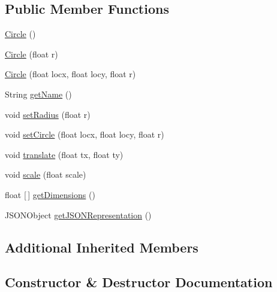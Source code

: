 \subsection*{Public Member Functions}
\begin{DoxyCompactItemize}
\item 
\mbox{\hyperlink{classbridges_1_1base_1_1_circle_a807231dff01120041d7d209d049e3029}{Circle}} ()
\item 
\mbox{\hyperlink{classbridges_1_1base_1_1_circle_a32543e951646009960c1839b2b8e1a0a}{Circle}} (float r)
\item 
\mbox{\hyperlink{classbridges_1_1base_1_1_circle_a04460bea57f9ef4bd0a3d45e9a937096}{Circle}} (float locx, float locy, float r)
\item 
String \mbox{\hyperlink{classbridges_1_1base_1_1_circle_a3782ea68f0419747c00bd8b2bfa31462}{get\+Name}} ()
\item 
void \mbox{\hyperlink{classbridges_1_1base_1_1_circle_a38c9f2a569af42461323239ba90f559e}{set\+Radius}} (float r)
\item 
void \mbox{\hyperlink{classbridges_1_1base_1_1_circle_ac11cce75c482bb5c5751dfd1d5353b44}{set\+Circle}} (float locx, float locy, float r)
\item 
void \mbox{\hyperlink{classbridges_1_1base_1_1_circle_ad4e474d78a1aea48f947e76b96c93ccb}{translate}} (float tx, float ty)
\item 
void \mbox{\hyperlink{classbridges_1_1base_1_1_circle_acbb48177b6e99326294cd90f74b58a27}{scale}} (float scale)
\item 
float \mbox{[}$\,$\mbox{]} \mbox{\hyperlink{classbridges_1_1base_1_1_circle_a0752cc5f6e261ade3d27f34c1c566c80}{get\+Dimensions}} ()
\item 
J\+S\+O\+N\+Object \mbox{\hyperlink{classbridges_1_1base_1_1_circle_ad6a8b8e2dca562fd3fa5254ee861ed70}{get\+J\+S\+O\+N\+Representation}} ()
\end{DoxyCompactItemize}
\subsection*{Additional Inherited Members}


\subsection{Constructor \& Destructor Documentation}
\mbox{\label{classbridges_1_1base_1_1_circle_a807231dff01120041d7d209d049e3029}} 
